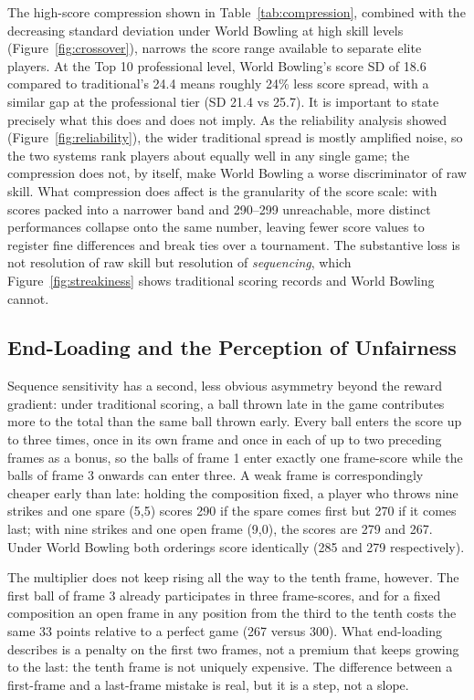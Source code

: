 \documentclass[USenglish]{article}
\theoremstyle{dgthm}
\theoremstyle{dgdef}
\begin{document}
The high-score compression shown in Table~\ref{tab:compression}, combined with the decreasing standard deviation under World Bowling at high skill levels (Figure~\ref{fig:crossover}), narrows the score range available to separate elite players. At the Top 10 professional level, World Bowling's score SD of 18.6 compared to traditional's 24.4 means roughly 24\% less score spread, with a similar gap at the professional tier (SD 21.4 vs 25.7). It is important to state precisely what this does and does not imply. As the reliability analysis showed (Figure~\ref{fig:reliability}), the wider traditional spread is mostly amplified noise, so the two systems rank players about equally well in any single game; the compression does not, by itself, make World Bowling a worse discriminator of raw skill. What compression does affect is the granularity of the score scale: with scores packed into a narrower band and 290--299 unreachable, more distinct performances collapse onto the same number, leaving fewer score values to register fine differences and break ties over a tournament. The substantive loss is not resolution of raw skill but resolution of \emph{sequencing}, which Figure~\ref{fig:streakiness} shows traditional scoring records and World Bowling cannot.

\subsection{End-Loading and the Perception of Unfairness}

Sequence sensitivity has a second, less obvious asymmetry beyond the reward gradient: under traditional scoring, a ball thrown late in the game contributes more to the total than the same ball thrown early. Every ball enters the score up to three times, once in its own frame and once in each of up to two preceding frames as a bonus, so the balls of frame 1 enter exactly one frame-score while the balls of frame 3 onwards can enter three. A weak frame is correspondingly cheaper early than late: holding the composition fixed, a player who throws nine strikes and one spare (5,5) scores 290 if the spare comes first but 270 if it comes last; with nine strikes and one open frame (9,0), the scores are 279 and 267. Under World Bowling both orderings score identically (285 and 279 respectively).

The multiplier does not keep rising all the way to the tenth frame, however. The first ball of frame 3 already participates in three frame-scores, and for a fixed composition an open frame in any position from the third to the tenth costs the same 33 points relative to a perfect game (267 versus 300). What end-loading describes is a penalty on the first two frames, not a premium that keeps growing to the last: the tenth frame is not uniquely expensive. The difference between a first-frame and a last-frame mistake is real, but it is a step, not a slope.
\end{document}
